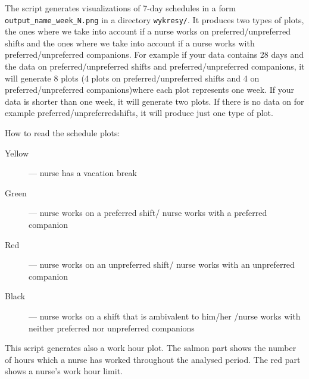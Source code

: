 The script generates visualizations of 7-day schedules in a form \texttt{output\_name\_week\_N.png} in a directory \texttt{wykresy/}. It produces two types of plots, the ones where we take into account if a nurse works on preferred/unpreferred shifts and the ones where we take into account if a nurse works with preferred/unpreferred companions. For example if your data contains 28 days and the data on preferred/unpreferred shifts and preferred/unpreferred companions, it will generate 8 plots (4 plots on preferred/unpreferred shifts and 4 on preferred/unpreferred companions)where each plot represents one week. If your data is shorter than one week, it will generate two plots. If there is no data on for example preferred/unpreferredshifts, it will produce just one type of plot.

How to read the schedule plots:

\begin{description}
    \item[Yellow] --- nurse has a vacation break
    \item[Green] --- nurse works on a preferred shift/ nurse works with a preferred companion
    \item[Red] --- nurse works on an unpreferred shift/ nurse works with an unpreferred companion
    \item[Black] --- nurse works on a shift that is ambivalent to him/her /nurse works with neither preferred nor unpreferred companions
\end{description}

This script generates also a work hour plot. The salmon part shows the number of hours which a nurse has worked throughout the analysed period. The red part shows a nurse's work hour limit.
